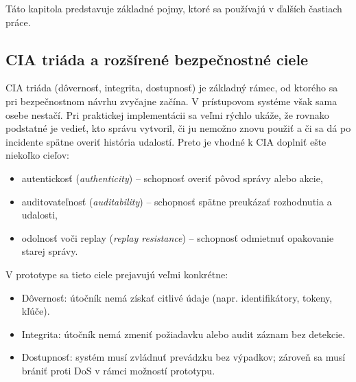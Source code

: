 \documentclass[journal,a4paper,onecolumn]{IEEEtran}
\begin{document}
Táto kapitola predstavuje základné pojmy, ktoré sa používajú v ďalších častiach práce.

\subsection{CIA triáda a rozšírené bezpečnostné ciele}

CIA triáda (dôvernosť, integrita, dostupnosť) je základný rámec, od ktorého sa pri bezpečnostnom návrhu zvyčajne začína. V prístupovom systéme však sama osebe nestačí. Pri praktickej implementácii sa veľmi rýchlo ukáže, že rovnako podstatné je vedieť, kto správu vytvoril, či ju nemožno znovu použiť a či sa dá po incidente spätne overiť história udalostí. Preto je vhodné k CIA doplniť ešte niekoľko cieľov:

\begin{itemize}[leftmargin=*,itemsep=2pt]
  \item autentickosť (\emph{authenticity}) -- schopnosť overiť pôvod správy alebo akcie,
  \item auditovateľnosť (\emph{auditability}) -- schopnosť spätne preukázať rozhodnutia a udalosti,
  \item odolnosť voči replay (\emph{replay resistance}) -- schopnosť odmietnuť opakovanie starej správy.
\end{itemize}

V prototype sa tieto ciele prejavujú veľmi konkrétne:

\begin{itemize}[leftmargin=*,itemsep=2pt]
  \item Dôvernosť: útočník nemá získať citlivé údaje (napr. identifikátory, tokeny, kľúče).
  \item Integrita: útočník nemá zmeniť požiadavku alebo audit záznam bez detekcie.
  \item Dostupnosť: systém musí zvládnuť prevádzku bez výpadkov; zároveň sa musí brániť proti DoS v rámci možností prototypu.
\end{itemize}
\end{document}

